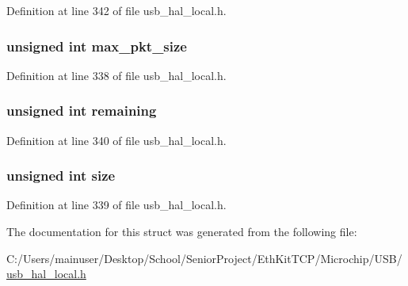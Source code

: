 Definition at line 342 of file usb\+\_\+hal\+\_\+local.\+h.

\hypertarget{struct___u_s_b___h_a_l___p_i_p_e___d_a_t_a_a00693e7e185ad131c5533e696338dd5a}{}
\subsubsection[{max\+\_\+pkt\+\_\+size}]{\setlength{\rightskip}{0pt plus 5cm}unsigned int max\+\_\+pkt\+\_\+size}\label{struct___u_s_b___h_a_l___p_i_p_e___d_a_t_a_a00693e7e185ad131c5533e696338dd5a}


Definition at line 338 of file usb\+\_\+hal\+\_\+local.\+h.

\hypertarget{struct___u_s_b___h_a_l___p_i_p_e___d_a_t_a_a3e03224b4745640802f8aae489382434}{}
\subsubsection[{remaining}]{\setlength{\rightskip}{0pt plus 5cm}unsigned int remaining}\label{struct___u_s_b___h_a_l___p_i_p_e___d_a_t_a_a3e03224b4745640802f8aae489382434}


Definition at line 340 of file usb\+\_\+hal\+\_\+local.\+h.

\hypertarget{struct___u_s_b___h_a_l___p_i_p_e___d_a_t_a_aac913b3a1f6ef005d66bf7a84428773e}{}
\subsubsection[{size}]{\setlength{\rightskip}{0pt plus 5cm}unsigned int size}\label{struct___u_s_b___h_a_l___p_i_p_e___d_a_t_a_aac913b3a1f6ef005d66bf7a84428773e}


Definition at line 339 of file usb\+\_\+hal\+\_\+local.\+h.



The documentation for this struct was generated from the following file\+:\begin{DoxyCompactItemize}
\item 
C\+:/\+Users/mainuser/\+Desktop/\+School/\+Senior\+Project/\+Eth\+Kit\+T\+C\+P/\+Microchip/\+U\+S\+B/\hyperlink{usb__hal__local_8h}{usb\+\_\+hal\+\_\+local.\+h}\end{DoxyCompactItemize}
